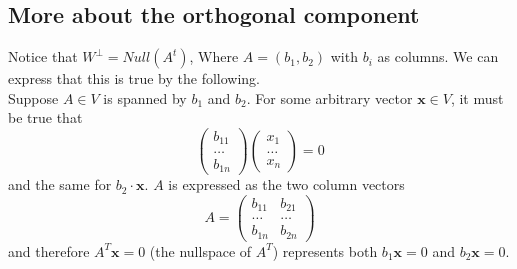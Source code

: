 \documentclass[journal, letterpaper]{IEEEtran}
\begin{document}
    \subsection{More about the orthogonal component}
    Notice that $W^\perp = Null(A^t)$, Where $A = (b_1, b_2)$ with $b_i$ as columns. We can express
    that this is true by the following.
    \newline \\ 
    Suppose $A \in V$ is spanned by $b_1$ and $b_2$. For some arbitrary vector $\mathbf{x} \in V$, it 
    must be true that
    $$
    \begin{pmatrix}
        b_{11} \\ \dots \\ b_{1n}
    \end{pmatrix} \begin{pmatrix}
        x_1 \\ \dots \\ x_n
    \end{pmatrix} = 0
    $$
    and the same for $b_2 \cdot \mathbf{x}$. $A$ is expressed as the two column vectors
    $$
    A = \begin{pmatrix}
        b_{11} & b_{21} \\ \dots & \dots \\b_{1n} & b_{2n}
    \end{pmatrix}
    $$
    and therefore $A^T\mathbf{x} = 0$ (the nullspace of $A^T$) represents both $b_1\mathbf{x} = 0$ and $b_2\mathbf{x} = 0$.
\end{document}
